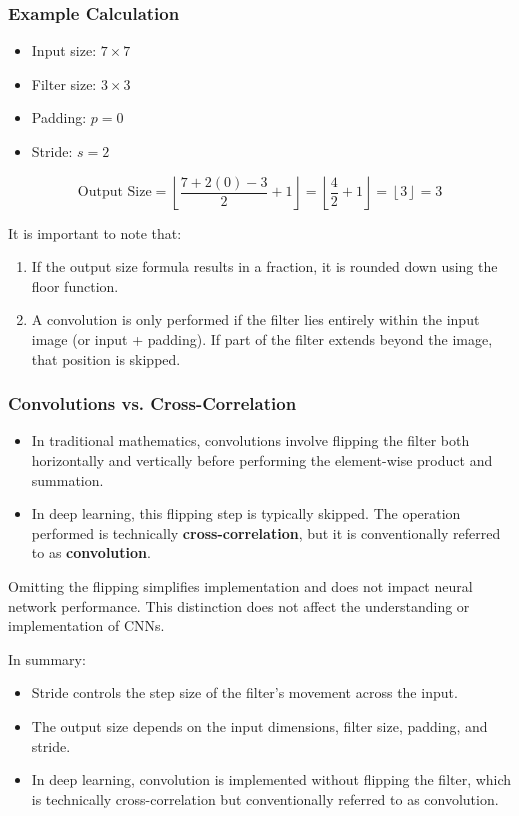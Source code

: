 \documentclass[letterpaper,12pt,notitlepage,twoside]{report}
\begin{document}
\subsubsection*{Example Calculation}
\begin{itemize}[nosep]
    \item Input size: $7 \times 7$
    \item Filter size: $3 \times 3$
    \item Padding: $p = 0$
    \item Stride: $s = 2$
\end{itemize}

\[
\text{Output Size} = \left\lfloor \frac{7 + 2(0) - 3}{2} + 1 \right\rfloor = \left\lfloor \frac{4}{2} + 1 \right\rfloor = \left\lfloor 3 \right\rfloor = 3
\]

It is important to note that:
\begin{enumerate}
    \item If the output size formula results in a fraction, it is rounded down using the floor function.
    \item A convolution is only performed if the filter lies entirely within the input image (or input + padding). If part of the filter extends beyond the image, that position is skipped.
\end{enumerate}

\subsubsection*{Convolutions vs. Cross-Correlation}
\begin{itemize}
    \item In traditional mathematics, convolutions involve flipping the filter both horizontally and vertically before performing the element-wise product and summation.
    \item In deep learning, this flipping step is typically skipped. The operation performed is technically \textbf{cross-correlation}, but it is conventionally referred to as \textbf{convolution}.
\end{itemize}

Omitting the flipping simplifies implementation and does not impact neural network performance. This distinction does not affect the understanding or implementation of CNNs.

In summary:
\begin{itemize}[nosep]
    \item Stride controls the step size of the filter’s movement across the input.
    \item The output size depends on the input dimensions, filter size, padding, and stride.
    \item In deep learning, convolution is implemented without flipping the filter, which is technically cross-correlation but conventionally referred to as convolution.
\end{itemize}
\end{document}
